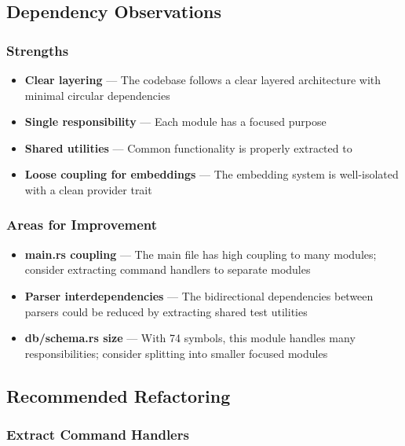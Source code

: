\subsection{Dependency Observations}

\subsubsection{Strengths}

\begin{itemize}
    \item \textbf{Clear layering} --- The codebase follows a clear layered architecture with minimal circular dependencies
    \item \textbf{Single responsibility} --- Each module has a focused purpose
    \item \textbf{Shared utilities} --- Common functionality is properly extracted to 
    \item \textbf{Loose coupling for embeddings} --- The embedding system is well-isolated with a clean provider trait
\end{itemize}

\subsubsection{Areas for Improvement}

\begin{itemize}
    \item \textbf{main.rs coupling} --- The main file has high coupling to many modules; consider extracting command handlers to separate modules
    \item \textbf{Parser interdependencies} --- The bidirectional dependencies between parsers could be reduced by extracting shared test utilities
    \item \textbf{db/schema.rs size} --- With 74 symbols, this module handles many responsibilities; consider splitting into smaller focused modules
\end{itemize}

\subsection{Recommended Refactoring}

\subsubsection{Extract Command Handlers}


